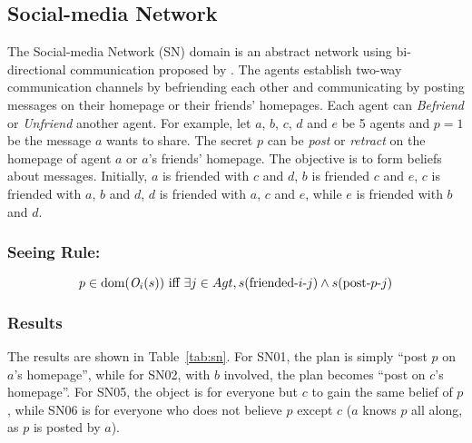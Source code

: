 \subsection{Social-media Network}
The Social-media Network (SN) domain is an abstract network using bi-directional communication proposed by \citet{Hu2022-ul}.
The agents establish two-way communication channels by befriending each other and communicating by posting messages on their homepage or their friends' homepages. Each agent can \emph{Befriend} or \emph{Unfriend}  another agent.
For example, let $a$, $b$, $c$, $d$ and $e$ be 5 agents and $p=1$ be the message $a$ wants to share.
The secret $p$ can be \emph{post} or \emph{retract} on the homepage of agent $a$ or $a$'s friends' homepage.
The objective is to form beliefs about messages.
Initially, $a$ is friended with $c$ and $d$, $b$ is friended $c$ and $e$, $c$ is friended with $a$, $b$ and $d$, $d$ is friended with $a$, $c$ and $e$, while $e$ is friended with $b$ and $d$.

\subsubsection{Seeing Rule:}
\[
    p \in \textrm{dom}(\mathit{O}_i(s)) \text{ iff } \exists j\in Agt, s(\text{friended-$i$-$j$}) \land s(\text{post-$p$-$j$})
\]

\subsubsection{Results}
The results are shown in Table~\ref{tab:sn}.
For SN01, the plan is simply ``post $p$ on $a$'s homepage'', while for SN02, with $b$ involved, the plan becomes ``post on $c$'s homepage''.
For SN05, the object is for everyone but $c$ to gain the same belief of $p$, while SN06 is for everyone who does not believe $p$ except $c$ ($a$ knows $p$ all along, as $p$ is posted by $a$).


        
